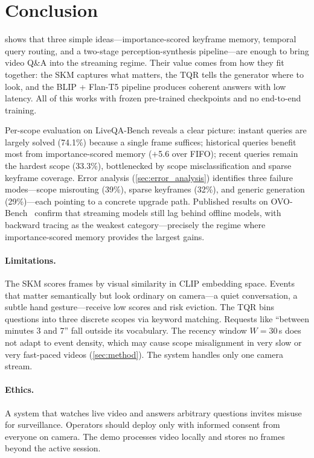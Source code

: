 \section{Conclusion}
\label{sec:conclusion}

\ours shows that three simple ideas---importance-scored keyframe memory, temporal query routing, and a two-stage perception-synthesis pipeline---are enough to bring video Q\&A into the streaming regime.
Their value comes from how they fit together: the SKM captures what matters, the TQR tells the generator where to look, and the BLIP + Flan-T5 pipeline produces coherent answers with low latency.
All of this works with frozen pre-trained checkpoints and no end-to-end training.

Per-scope evaluation on LiveQA-Bench reveals a clear picture:
instant queries are largely solved (74.1\%) because a single frame suffices;
historical queries benefit most from importance-scored memory ($+$5.6 over FIFO);
recent queries remain the hardest scope (33.3\%), bottlenecked by scope misclassification and sparse keyframe coverage.
Error analysis (\cref{sec:error_analysis}) identifies three failure modes---scope misrouting (39\%), sparse keyframes (32\%), and generic generation (29\%)---each pointing to a concrete upgrade path.
Published results on OVO-Bench~\cite{li2025ovobench} confirm that streaming models still lag behind offline models, with backward tracing as the weakest category---precisely the regime where importance-scored memory provides the largest gains.

\paragraph{Limitations.}
The SKM scores frames by visual similarity in CLIP embedding space. Events that matter semantically but look ordinary on camera---a quiet conversation, a subtle hand gesture---receive low scores and risk eviction.
The TQR bins questions into three discrete scopes via keyword matching. Requests like ``between minutes 3 and 7'' fall outside its vocabulary.
The recency window $W\!=\!30$\,s does not adapt to event density, which may cause scope misalignment in very slow or very fast-paced videos (\cref{sec:method}).
The system handles only one camera stream.

\paragraph{Ethics.}
A system that watches live video and answers arbitrary questions invites misuse for surveillance. Operators should deploy \ours only with informed consent from everyone on camera. The demo processes video locally and stores no frames beyond the active session.


